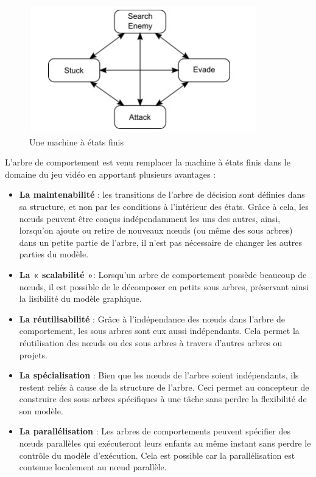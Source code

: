 \documentclass[a4paper, 12pt]{article} %
\begin{document}
\begin{figure}[!h]%
	\begin{center} 
		\includegraphics[width=0.60\columnwidth]{images/fsm.jpg}%
		\caption{Une machine à états finis}%
	\end{center}
\end{figure}

\newpage

L’arbre de comportement est venu remplacer la machine à états finis dans le domaine du jeu vidéo en apportant plusieurs avantages :

\begin{itemize}
	\item \textbf{La maintenabilité} : les transitions de l’arbre de décision sont définies dans sa structure, et non par les conditions à l’intérieur des états. Grâce à cela, les nœuds peuvent être conçus indépendamment les uns des autres, ainsi, lorsqu’on ajoute ou retire de nouveaux nœuds (ou même des sous arbres) dans un petite partie de l’arbre, il n’est pas nécessaire de changer les autres parties du modèle.
	\item \textbf{La « scalabilité »}: Lorsqu’un arbre de comportement possède beaucoup de nœuds, il est possible de le décomposer en petits sous arbres, préservant ainsi la lisibilité du modèle graphique.
	\item \textbf{La réutilisabilité} : Grâce à l’indépendance des nœuds dans l’arbre de comportement, les sous arbres sont eux aussi indépendants. Cela permet la réutilisation des nœuds ou des sous arbres à travers d’autres arbres ou projets.
	\item \textbf{La spécialisation} : Bien que les nœuds de l’arbre soient indépendants, ils restent reliés à cause de la structure de l’arbre. Ceci permet au concepteur de construire des sous arbres spécifiques à une tâche sans perdre la flexibilité de son modèle.
	\item \textbf{La parallélisation} : Les arbres de comportements peuvent spécifier des nœuds parallèles qui exécuteront leurs enfants au même instant sans perdre le contrôle du modèle d’exécution. Cela est possible car la parallélisation est contenue localement au nœud parallèle.
\end{itemize}
\end{document}
